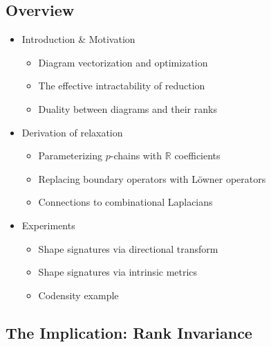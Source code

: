 \documentclass[
  letterpaper,
  DIV=11,
  numbers=noendperiod,
  oneside]{scrartcl}
\providecommand{\tightlist}{%
  \setlength{\itemsep}{0pt}\setlength{\parskip}{0pt}}\usepackage{longtable,booktabs,array}
\begin{document}
\hypertarget{overview}{%
\subsection{Overview}\label{overview}}

\begin{itemize}
\tightlist
\item
  Introduction \& Motivation

  \begin{itemize}
  \tightlist
  \item
    Diagram vectorization and optimization
  \item
    The effective intractability of reduction
  \item
    Duality between diagrams and their ranks
  \end{itemize}
\end{itemize}

\begin{itemize}
\tightlist
\item
  Derivation of relaxation

  \begin{itemize}
  \tightlist
  \item
    Parameterizing \(p\)-chains with \(\mathbb{R}\) coefficients
  \item
    Replacing boundary operators with Löwner operators
  \item
    Connections to combinational Laplacians
  \end{itemize}
\end{itemize}

\begin{itemize}
\tightlist
\item
  Experiments

  \begin{itemize}
  \tightlist
  \item
    Shape signatures via directional transform
  \item
    Shape signatures via intrinsic metrics\\
  \item
    Codensity example
  \end{itemize}
\end{itemize}

\hypertarget{the-implication-rank-invariance}{%
\subsection{The Implication: Rank
Invariance}\label{the-implication-rank-invariance}}
\end{document}
